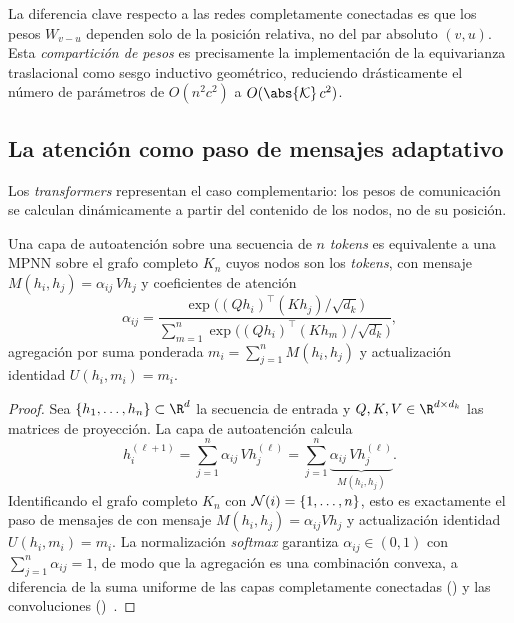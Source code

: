La diferencia clave respecto a las redes completamente conectadas es que los pesos
$W_{v-u}$ dependen solo de la posici\'on relativa, no del par absoluto $(v, u)$.
Esta \emph{compartici\'on de pesos} es precisamente la implementaci\'on de la
equivarianza traslacional como sesgo inductivo geom\'etrico, reduciendo
dr\'asticamente el n\'umero de par\'ametros de $O(n^2 c^2)$ a
$O(\abs{\mathcal{K}}\, c^2)$.

\subsection{La atenci\'on como paso de mensajes adaptativo}
\label{subsec:priors:attention-mpnn}

Los \emph{transformers} representan el caso complementario: los pesos de
comunicaci\'on se calculan din\'amicamente a partir del contenido de los nodos, no
de su posici\'on.

\begin{proposition}
\label{prop:priors:attention-mpnn}
Una capa de autoatenci\'on sobre una secuencia de $n$ \emph{tokens} es
equivalente a una MPNN sobre el grafo completo $K_n$ cuyos nodos son los
\emph{tokens}, con mensaje $M(h_i, h_j) = \alpha_{ij}\, V h_j$ y coeficientes de
atenci\'on
\[
  \alpha_{ij}
    = \frac{\exp\!\bigl((Q h_i)^{\!\top}(K h_j)/\sqrt{d_k}\bigr)}
           {\sum_{m=1}^{n} \exp\!\bigl((Q h_i)^{\!\top}(K h_m)/\sqrt{d_k}\bigr)},
\]
agregaci\'on por suma ponderada $m_i = \sum_{j=1}^{n} M(h_i, h_j)$ y
actualizaci\'on identidad $U(h_i, m_i) = m_i$.
\end{proposition}

\begin{proof}
Sea $\{h_1, \dots, h_n\} \subset \R^d$ la secuencia de entrada y
$Q, K, V \in \R^{d \times d_k}$ las matrices de proyecci\'on. La capa de
autoatenci\'on calcula
\[
  h_i^{(\ell+1)} = \sum_{j=1}^{n} \alpha_{ij}\, V h_j^{(\ell)}
    = \sum_{j=1}^{n} \underbrace{\alpha_{ij}\, V h_j^{(\ell)}}_{M(h_i, h_j)}.
\]
Identificando el grafo completo $K_n$ con $\mathcal{N}(i) = \{1, \dots, n\}$, esto es
exactamente el paso de mensajes de  con mensaje
$M(h_i, h_j) = \alpha_{ij} V h_j$ y actualizaci\'on identidad
$U(h_i, m_i) = m_i$. La normalizaci\'on \emph{softmax} garantiza
$\alpha_{ij} \in (0, 1)$ con $\sum_{j=1}^{n} \alpha_{ij} = 1$, de modo que la
agregaci\'on es una combinaci\'on convexa, a diferencia de la suma uniforme de las
capas completamente conectadas () y las convoluciones
()~\citep{vaswani2017attentionneed}. \qedhere
\end{proof}


